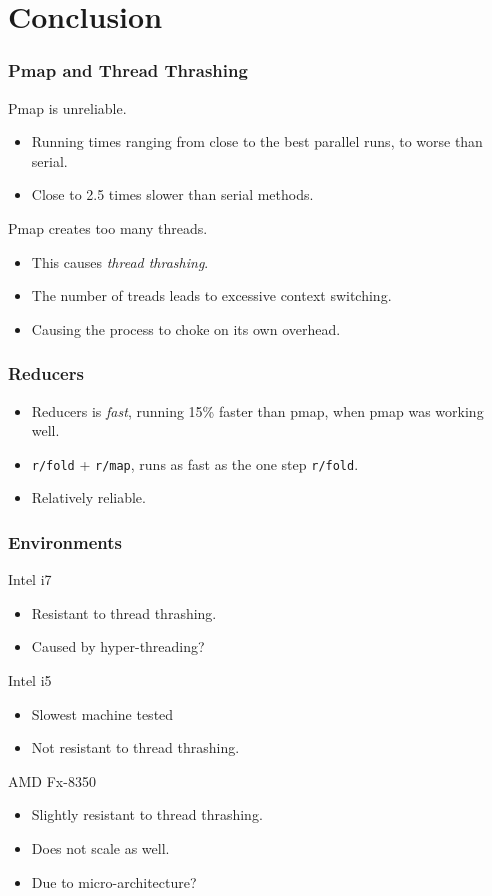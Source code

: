 \documentclass{beamer}
\newcommand{\clocode}[1]{{\texttt {#1}}}
\begin{document}
\section{Conclusion}
\begin{frame}
\frametitle{Pmap and Thread Thrashing}
	Pmap is unreliable.
	\begin{itemize}
	\item Running times ranging from close to the best parallel runs, to worse than serial.
	\item Close to 2.5 times slower than serial methods.
	\end{itemize}
Pmap creates too many threads.
	\begin{itemize}
	\item This causes \emph{thread thrashing}.
	\item The number of treads leads to excessive context switching.
	\item Causing the process to choke on its own overhead.
	\end{itemize}
\end{frame}

\begin{frame}
\frametitle{Reducers}
	\begin{itemize}
	\item Reducers is \emph{fast}, running 15\% faster than pmap, when pmap was working well.
	\item \clocode{r/fold} + \clocode{r/map}, runs as fast as the one step \clocode{r/fold}.
	\item Relatively reliable.
	\end{itemize}
\end{frame}

\begin{frame}
\frametitle{Environments}
Intel i7 
	\begin{itemize}
	\item Resistant to thread thrashing.
	\item Caused by hyper-threading?
	\end{itemize}
Intel i5
	\begin{itemize}
	\item Slowest machine tested
	\item Not resistant to thread thrashing.
	\end{itemize}
AMD Fx-8350
	\begin{itemize}
	\item Slightly resistant to thread thrashing.
	\item Does not scale as well.
	\item Due to micro-architecture?
	\end{itemize}
	
\end{frame}
\end{document}
